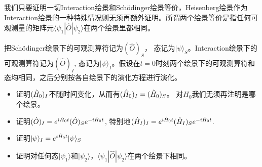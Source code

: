 \documentclass[CJK]{beamer}
\begin{document}
\begin{frame} 
\bch
{\small 
我们只要证明一切Interaction绘景和Sch\"odinger绘景等价，Heisenberg绘景作为Interaction绘景的一种特殊情况则无须再额外证明。所谓两个绘景等价是指任何可观测量的矩阵元$\langle \psi_1 | \hat{O}|\psi_2\rangle$在两个绘景里都相同。
\skipline

把Sch\"odinger绘景下的可观测算符记为$(\hat{O})_S$， 态记为$|\psi\rangle_S$。Interaction绘景下的可观测算符记为$(\hat{O})_I$, 态记为$|\psi\rangle_I$。假设在$t=0$时刻两个绘景下的可观测算符和态均相同，之后分别按各自绘景下的演化方程进行演化。
\begin{itemize}
\item{证明$({\hat{H}}_0)_I$不随时间变化，从而有$({\hat{H}}_0)_I=({\hat{H}}_0)_S$。 对$H_0$我们无须再注明是哪个绘景。}
\item{证明$(\hat{O})_I = e^{{\dot{\imath}}{\hat{H}}_0 t}(\hat{O})_S e^{-{\dot{\imath}}{\hat{H}}_0 t}$, 特别地$({\hat{H}}_I)_I= e^{{\dot{\imath}}{\hat{H}}_0 t}({\hat{H}}_I)_S e^{-{\dot{\imath}}{\hat{H}}_0 t}$.}
\item{证明$|\psi\rangle_I = e^{{\dot{\imath}}{\hat{H}}_0 t} |\psi\rangle_S $}
\item{证明对任何态$|\psi_1\rangle$和$|\psi_2\rangle$，$\langle \psi_1 | \hat{O}|\psi_2\rangle$在两个绘景下相同。}
\end{itemize}
}
\ech
\end{frame}



\begin{frame} 
\chtitle{} 
\bch

\ech
\end{frame}
\end{document}
